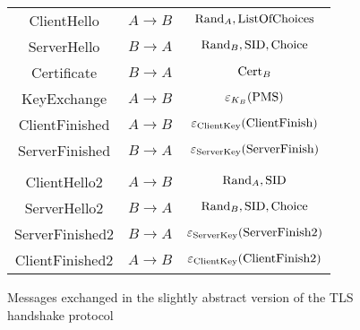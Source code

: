 \documentclass[a4paper,fleqn]{cas-dc}
\begin{document}

\begin{figure}[]
	\centering
	\begin{tabular}{ c c c }
		ClientHello & $A \rightarrow B$  & ${\rm Rand}_A, {\rm ListOfChoices}$ \\ 
		ServerHello & $B \rightarrow A$ & ${\rm Rand}_B, {\rm SID}, {\rm Choice}$ \\  
		Certificate & $B \rightarrow A$ & ${\rm Cert}_B$ \\ 
		KeyExchange & $A \rightarrow B$ & $\varepsilon_{K_B}(\rm PMS)$ \\ 
		ClientFinished & $A \rightarrow B$ & $\varepsilon_{\rm ClientKey}(\rm ClientFinish)$ \\
		ServerFinished & $B \rightarrow A$ & $\varepsilon_{\rm ServerKey}(\rm ServerFinish)$ \\
		\\
		ClientHello2 & $A \rightarrow B$  & ${\rm Rand}_A, {\rm SID}$ \\
		ServerHello2 & $B \rightarrow A$ & ${\rm Rand}_B, {\rm SID, Choice}$ \\
		ServerFinished2 & $B \rightarrow A$ & $\varepsilon_{\rm ServerKey}(\rm ServerFinish2)$ \\
		ClientFinished2 & $A \rightarrow B$ & $\varepsilon_{\rm ClientKey}(\rm ClientFinish2)$ \\
	\end{tabular}
	\caption{Messages exchanged in the slightly abstract version of the TLS handshake protocol}
	
	\label{fig-tls}
\end{figure}
\end{document}
